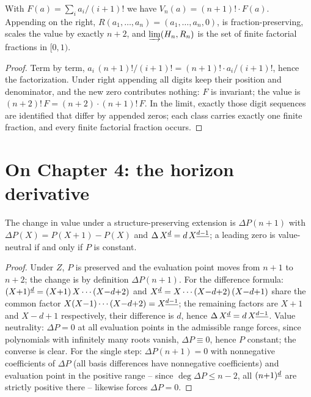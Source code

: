 \begin{satz}
With $F(a)=\sum_i a_i/(i+1)!$ we have $V_n(a)=(n+1)!\cdot F(a)$.
Appending on the right, $R(a_1,\ldots,a_n)=(a_1,\ldots,a_n,0)$, is
fraction-preserving, scales the value by exactly $n+2$, and
$\varinjlim(H_n,R_n)$ is the set of finite factorial fractions
in $[0,1)$.
\end{satz}

\begin{proof}
Term by term, $a_i\,(n+1)!/(i+1)!=(n+1)!\cdot a_i/(i+1)!$, hence
the factorization. Under right appending all digits keep their
position and denominator, and the new zero contributes nothing:
$F$ is invariant; the value is $(n+2)!\,F=(n+2)\cdot(n+1)!\,F$. In
the limit, exactly those digit sequences are identified that
differ by appended zeros; each class carries exactly one finite
fraction, and every finite factorial fraction occurs.
\end{proof}

\section*{On Chapter 4: the horizon derivative}

\begin{satz}
The change in value under a structure-preserving extension is
$\Delta P(n+1)$ with $\Delta P(X)=P(X{+}1)-P(X)$ and
$\Delta\,X^{\underline{d}}=d\,X^{\underline{d-1}}$; a leading zero is value-neutral
if and only if $P$ is constant.
\end{satz}

\begin{proof}
Under $Z$, $P$ is preserved and the evaluation point moves from
$n{+}1$ to $n{+}2$; the change is by definition
$\Delta P(n{+}1)$. For the difference formula:
$(X{+}1)^{\underline{d}}=(X{+}1)\,X\cdots(X{-}d{+}2)$ and
$X^{\underline{d}}=X\cdots(X{-}d{+}2)\,(X{-}d{+}1)$ share the common factor
$X(X{-}1)\cdots(X{-}d{+}2)=X^{\underline{d-1}}$; the remaining factors are
$X{+}1$ and $X{-}d{+}1$ respectively, their difference is $d$,
hence $\Delta\,X^{\underline{d}}=d\,X^{\underline{d-1}}$.
Value neutrality: $\Delta P=0$ at all evaluation points in the
admissible range forces, since polynomials with infinitely many
roots vanish, $\Delta P\equiv0$, hence $P$ constant; the converse
is clear. For the single step: $\Delta P(n{+}1)=0$ with
nonnegative coefficients of $\Delta P$ (all basis differences
have nonnegative coefficients) and evaluation point in the
positive range -- since
$\deg\Delta P\le n-2$, all $(n{+}1)^{\underline{d}}$ are strictly positive
there -- likewise forces $\Delta P=0$.
\end{proof}

